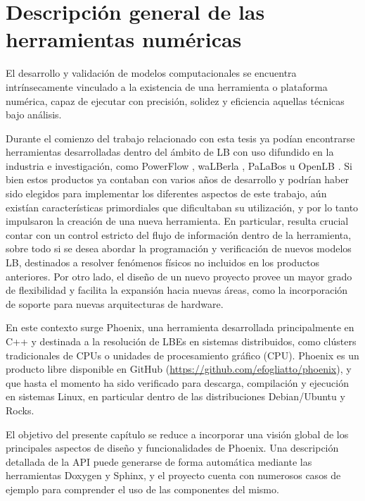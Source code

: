 \chapter{Descripci\'on general de las herramientas num\'ericas}

El desarrollo y validaci\'on de modelos computacionales se encuentra intr\'insecamente vinculado a la existencia de una herramienta o plataforma num\'erica, capaz de ejecutar con precisi\'on, solidez y eficiencia aquellas t\'ecnicas bajo an\'alisis. 

Durante el comienzo del trabajo relacionado con esta tesis ya pod\'ian encontrarse herramientas desarrolladas dentro del \'ambito de LB con uso difundido en la industria e investigaci\'on, como PowerFlow \cite{noauthor_powerflow_nodate}, waLBerla \cite{noauthor_walberla_nodate}, PaLaBos \cite{latt_palabos_2020} u OpenLB \cite{noauthor_openlb_nodate}. Si bien estos productos ya contaban con varios a\~nos de desarrollo y podr\'ian haber sido elegidos para implementar los diferentes aspectos de este trabajo, a\'un exist\'ian caracter\'isticas primordiales que dificultaban su utilizaci\'on, y por lo tanto impulsaron la creaci\'on de una nueva herramienta. En particular, resulta crucial contar con un control estricto del flujo de informaci\'on dentro de la herramienta, sobre todo si se desea abordar la programaci\'on y verificaci\'on de nuevos modelos LB, destinados a resolver fen\'omenos f\'isicos no incluidos en los productos anteriores. Por otro lado, el dise\~no de un nuevo proyecto provee un mayor grado de flexibilidad y facilita la expansi\'on hacia nuevas \'areas, como la incorporaci\'on de soporte para nuevas arquitecturas de hardware.

En este contexto surge Phoenix, una herramienta desarrollada principalmente en C++ y destinada a la resoluci\'on de LBEs en sistemas distribuidos, como cl\'usters tradicionales de CPUs o unidades de procesamiento gr\'afico (CPU). Phoenix es un producto libre disponible en GitHub (\url{https://github.com/efogliatto/phoenix}), y que hasta el momento ha sido verificado para descarga, compilaci\'on y ejecuci\'on en sistemas Linux, en particular dentro de las distribuciones Debian/Ubuntu y Rocks. 

El objetivo del presente cap\'itulo se reduce a incorporar una visi\'on global de los principales aspectos de dise\~no y funcionalidades de Phoenix. Una descripci\'on detallada de la API puede generarse de forma autom\'atica mediante las herramientas Doxygen y Sphinx, y el proyecto cuenta con numerosos casos de ejemplo para comprender el uso de las componentes del mismo.



